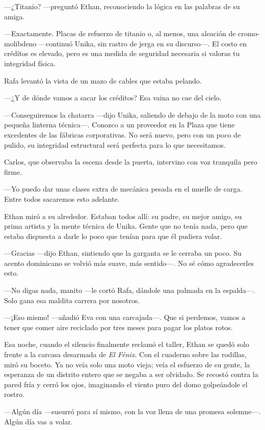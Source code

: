 \documentclass[11pt,twoside]{book}
\begin{document}
 ---¿Titanio? ---preguntó Ethan, reconociendo la lógica en las palabras de su amiga.

 ---Exactamente. Placas de refuerzo de titanio o, al menos, una aleación de cromo-molibdeno ---continuó Unika, sin rastro de jerga en su discurso---. El costo en créditos es elevado, pero es una medida de seguridad necesaria si valoras tu integridad física.

Rafa levantó la vista de un mazo de cables que estaba pelando.

---¿Y de dónde vamos a sacar los créditos? Esa vaina no cae del cielo.

---Conseguiremos la chatarra ---dijo Unika, saliendo de debajo de la moto con una pequeña linterna técnica---. Conozco a un proveedor en la Plaza que tiene excedentes de las fábricas corporativas. No será nuevo, pero con un poco de pulido, su integridad estructural será perfecta para lo que necesitamos.

Carlos, que observaba la escena desde la puerta, intervino con voz tranquila pero firme.

---Yo puedo dar unas clases extra de mecánica pesada en el muelle de carga. Entre todos sacaremos esto adelante.

Ethan miró a su alrededor. Estaban todos allí: su padre, su mejor amigo, su prima artista y la mente técnica de Unika. Gente que no tenía nada, pero que estaba dispuesta a darle lo poco que tenían para que él pudiera volar.

---Gracias ---dijo Ethan, sintiendo que la garganta se le cerraba un poco. Su acento dominicano se volvió más suave, más sentido---. No sé cómo agradecerles esto.

---No digas nada, manito ---le cortó Rafa, dándole una palmada en la espalda---. Solo gana esa maldita carrera por nosotros.

---¡Eso mismo! ---añadió Eva con una carcajada---. Que si perdemos, vamos a tener que comer aire reciclado por tres meses para pagar los platos rotos.

Esa noche, cuando el silencio finalmente reclamó el taller, Ethan se quedó solo frente a la carcasa desarmada de \textit{El Fénix}. Con el cuaderno sobre las rodillas, miró su boceto. Ya no veía solo una moto vieja; veía el esfuerzo de su gente, la esperanza de un distrito entero que se negaba a ser olvidado. Se recostó contra la pared fría y cerró los ojos, imaginando el viento puro del domo golpeándole el rostro.

---Algún día ---susurró para sí mismo, con la voz llena de una promesa solemne---. Algún día vas a volar.
\end{document}
